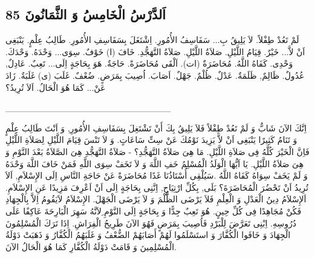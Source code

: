 \documentclass[a5paper]{article}
\begin{document}
\subsection[اَلدَّرْسُ الْخَامِسُ وَ الثَّمَانُونَ 85]{اَلدَّرْسُ الْخَامِسُ وَ الثَّمَانُونَ 85}
لَمْ تَعُدْ طِفْلاً. لاَ يَلِيقُ بِ... سَفَاسِفُ الأُمُورِ. اِشْتَغَلَ بِسَفَاسِفِ الأُمُورِ. طَالِبُ عِلْمٍ. يَنْبَغِى اَنْ لاَّ... خَيْرٌ. قِيَامُ اللَّيْلِ. صَلاَةُ اللَّيْلِ. صَلاَةُ التَّهَجُّدِ. خَافَ (ا) خَوْفٌ. سِوَى... وَحْدَهُ. وَحْدَكَ. وَحْدِى. كَفَاهُ اللَّهُ. مُحَاضَرَةٌ (ات). اَلْقَى مُحَاضَرَةً. حَاجَةٌ. هَوَ بِحَاجَةٍ اِلَى... تَعِبٌ. عَادِلٌ, عُدُولٌ. ظَالِمٌ, ظَلَمَةٌ. عَدْلٌ. ظُلْمٌ. جَهْلٌ. اَصَابَ. اُصِيبَ بِمَرَضٍ. ضُعْفٌ. غَلَبَ (ى) غَلَبَةٌ. زَادَ عَنْ... كَمَا هُوَ الْحَالُ. اَلاَ تُرِيدُ؟

\_\_\_\_\_\_\_\_\_\_\_\_\_\_\_\_\_\_\_\_\_\_\_\_\_\_

اِنَّكَ الآنَ شَابٌّ وَ لَمْ تَعُدْ طِفْلاً فَلاَ يَلِيقُ بِكَ أَنْ تَشْتَغِلَ بِسَفَاسِفِ الأُمُورِ, وَ اَنْتَ طَالِبُ عِلْمٍ وَ تَنَامُ كَثِيرًا يَنْبَغِى اَنْ لاَّ يَزِيدَ نَوْمُكَ عَنْ سِتِّ سَاعَاتٍ. وَ لاَ تَنْسَ قِيَامَ اللَّيْلِ لِصَلاَةِ اللَّيْلِ فَاِنَّ الْخَيْرَ كُلَّهُ فِى صَلاَةِ اللَّيْلِ. مَا هِىَ صَلاَةُ التَّهَجُّدِ؟ - صَلاَةُ التَّهَجُّدِ هِىَ الصَّلاَةُ بَعْدَ النَّوْمِ وَ هِىَ صَلاَةُ اللَّيْلِ. يَا اَيُّهَا الْوَلَدُ الْمُسْلِمُ خَفِ اللَّهَ وَ لاَ تَخَفْ سِوَى اللَّهِ فَمَنْ خَافَ اللَّهَ وَحْدَهُ وَ لَمْ يَخَفْ سِوَاهُ كَفَاهُ اللَّهُ .سَيُلْقِى أُسْتَاذُنَا غَدًا مُحَاضَرَةً عَنْ حَاجَةِ النَّاسِ اِلَى الإِسْلاَمِ, اَلاَ تُرِيدُ اَنْ تَحْضُرَ الْمُحَاضَرَةَ؟ بَلَى, بِكُلِّ ارْتِيَاحٍ, اِنَّنِى بِحَاجَةٍ اِلَى اَنْ اَعْرِفَ مَزِيدًا عَنِ الإِسْلاَمِ. اَلإِسْلاَمُ دِينُ الْعَدْلِ وَ الْعِلْمِ فَلاَ يَرْضَى الظُّلْمَ وَ لاَ يَرْضَى الْجَهْلَ. الإِسْلاَمُ لاَيَقُومُ اِلاَّ بِالْجِهَادِ فَكُنْ مُجَاهِدًا فِى كُلِّ حِينٍ. هُوَ تَعِبٌ جِدًّا وَ بِحَاجَةٍ اِلَى النَّوْمِ ِلاَنَّهُ سَهِرَ الْبَارِحَةَ عَاكِفًا عَلَى دُرُوسِهِ. اِبْنِى تَعَرَّضَ لِلْبَرْدِ فَاُصِيبَ بِمَرَضٍ فَهُوَ الآنَ طَرِيحُ الْفِرَاشِ. اِذَا تَرَكَ الْمُسْلِمُونَ الْجِهَادَ وَ خَافَوا الْكُفَّارَ وَ استَسْلَمُوا لَهُمْ أَصَابَهُمْ الضُّعْفُ وَ غَلَبَهُمُ الْكُفَّارُ وَ ذَهَبَتْ دَوْلَةُ الْمُسْلِمِينَ وَ قَامَتْ دَوْلَةُ الْكُفَّارِ كَمَا هُوَ الْحَالُ الآنَ.
\end{document}
